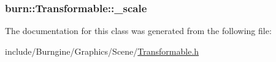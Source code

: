 \hypertarget{classburn_1_1_transformable_a80e5ca4d02b2d58593b751b040e86492}{
\subsubsection[{\-\_\-scale}]{ burn\-::\-Transformable\-::\-\_\-scale\hspace{0.3cm}{\ttfamily [protected]}}}\label{classburn_1_1_transformable_a80e5ca4d02b2d58593b751b040e86492}


The documentation for this class was generated from the following file\-:\begin{DoxyCompactItemize}
\item 
include/\-Burngine/\-Graphics/\-Scene/\hyperlink{_transformable_8h}{Transformable.\-h}\end{DoxyCompactItemize}
